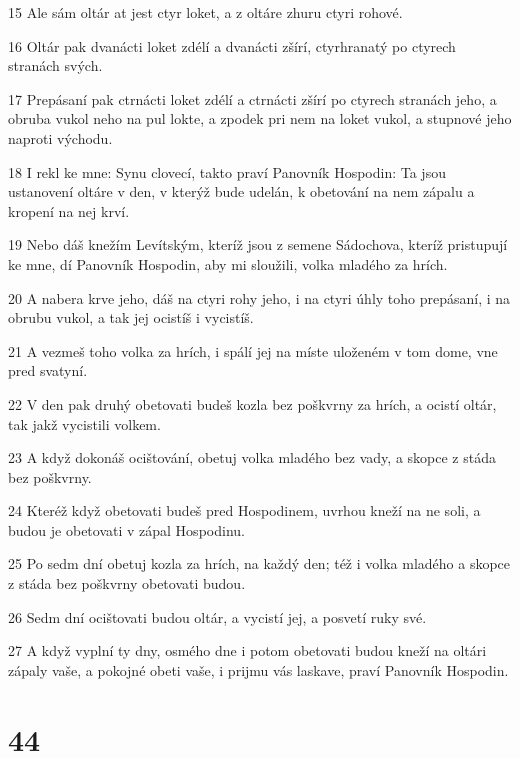 \par 15 Ale sám oltár at jest ctyr loket, a z oltáre zhuru ctyri rohové.
\par 16 Oltár pak dvanácti loket zdélí a dvanácti zšírí, ctyrhranatý po ctyrech stranách svých.
\par 17 Prepásaní pak ctrnácti loket zdélí a ctrnácti zšírí po ctyrech stranách jeho, a obruba vukol neho na pul lokte, a zpodek pri nem na loket vukol, a stupnové jeho naproti východu.
\par 18 I rekl ke mne: Synu clovecí, takto praví Panovník Hospodin: Ta jsou ustanovení oltáre v den, v kterýž bude udelán, k obetování na nem zápalu a kropení na nej krví.
\par 19 Nebo dáš knežím Levítským, kteríž jsou z semene Sádochova, kteríž pristupují ke mne, dí Panovník Hospodin, aby mi sloužili, volka mladého za hrích.
\par 20 A nabera krve jeho, dáš na ctyri rohy jeho, i na ctyri úhly toho prepásaní, i na obrubu vukol, a tak jej ocistíš i vycistíš.
\par 21 A vezmeš toho volka za hrích, i spálí jej na míste uloženém v tom dome, vne pred svatyní.
\par 22 V den pak druhý obetovati budeš kozla bez poškvrny za hrích, a ocistí oltár, tak jakž vycistili volkem.
\par 23 A když dokonáš ocištování, obetuj volka mladého bez vady, a skopce z stáda bez poškvrny.
\par 24 Kteréž když obetovati budeš pred Hospodinem, uvrhou kneží na ne soli, a budou je obetovati v zápal Hospodinu.
\par 25 Po sedm dní obetuj kozla za hrích, na každý den; též i volka mladého a skopce z stáda bez poškvrny obetovati budou.
\par 26 Sedm dní ocištovati budou oltár, a vycistí jej, a posvetí ruky své.
\par 27 A když vyplní ty dny, osmého dne i potom obetovati budou kneží na oltári zápaly vaše, a pokojné obeti vaše, i prijmu vás laskave, praví Panovník Hospodin.

\chapter{44}

